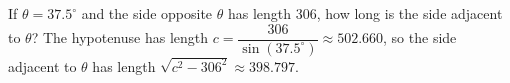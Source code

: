 {If $\theta = 37.5^{\circ}$ and the side opposite $\theta$ has length 306, how long is the side adjacent to $\theta$?}
{The hypotenuse has length $c = \dfrac{306}{\sin(37.5^{\circ})}\approx 502.660$, so the side adjacent to $\theta$ has length  $\sqrt{c^2 - 306^{2}} \approx 398.797$.}